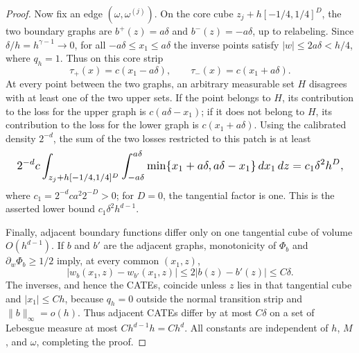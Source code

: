 \documentclass{article}
\begin{document}
\begin{proof}
Now fix an edge \((\omega,\omega^{(j)})\). On the core cube \(z_j+h[-1/4,1/4]^D\), the two boundary graphs are \(b^+(z)=a\delta\) and \(b^-(z)=-a\delta\), up to relabeling. Since \(\delta/h=h^{\gamma-1}\to0\), for all \(-a\delta\le x_1\le a\delta\) the inverse points satisfy \(|w|\le2a\delta<h/4\), where \(q_h=1\). Thus on this core strip
\[
 \tau_+(x)=c(x_1-a\delta),
 \qquad
 \tau_-(x)=c(x_1+a\delta).
\]
At every point between the two graphs, an arbitrary measurable set \(H\) disagrees with at least one of the two upper sets. If the point belongs to \(H\), its contribution to the loss for the upper graph is \(c(a\delta-x_1)\); if it does not belong to \(H\), its contribution to the loss for the lower graph is \(c(x_1+a\delta)\). Using the calibrated density \(2^{-d}\), the sum of the two losses restricted to this patch is at least
\[
\makebox[\linewidth][c]{\resizebox{0.98\linewidth}{!}{\(\displaystyle 2^{-d}c\int_{z_j+h[-1/4,1/4]^D}
 \int_{-a\delta}^{a\delta}
 \min\{x_1+a\delta,a\delta-x_1\}\,dx_1\,dz
 =c_1\delta^2h^D,\)}}
\]
where \(c_1=2^{-d}ca^2 2^{-D}>0\); for \(D=0\), the tangential factor is one. This is the asserted lower bound \(c_1\delta^2h^{d-1}\).

Finally, adjacent boundary functions differ only on one tangential cube of volume \(O(h^{d-1})\). If \(b\) and \(b'\) are the adjacent graphs, monotonicity of \(\Phi_b\) and \(\partial_w\Phi_b\ge1/2\) imply, at every common \((x_1,z)\),
\[
 |w_b(x_1,z)-w_{b'}(x_1,z)|\le2|b(z)-b'(z)|\le C\delta.
\]
The inverses, and hence the CATEs, coincide unless \(z\) lies in that tangential cube and \(|x_1|\le Ch\), because \(q_h=0\) outside the normal transition strip and \(\|b\|_\infty=o(h)\). Thus adjacent CATEs differ by at most \(C\delta\) on a set of Lebesgue measure at most \(Ch^{d-1}h=Ch^d\). All constants are independent of \(h\), \(M\), and \(\omega\), completing the proof.
\end{proof}
\end{document}
